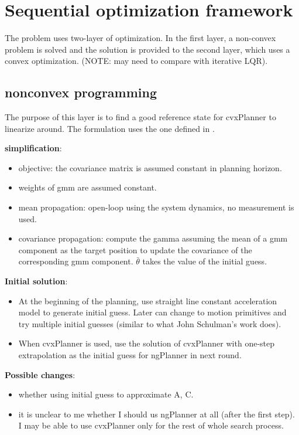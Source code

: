 \documentclass[letterpaper, 10 pt, conference]{ieeeconf}  %
\begin{document}
\section{Sequential optimization framework}
The problem uses two-layer of optimization. In the first layer, a non-convex problem is solved and the solution is provided to the second layer, which uses a convex optimization. (NOTE: may need to compare with iterative LQR).
\subsection{nonconvex programming}
The purpose of this layer is to find a good reference state for cvxPlanner to linearize around. The formulation uses the one defined in .

\textbf{simplification}:
\begin{itemize}
	\item objective: the covariance matrix is assumed constant in planning horizon.
	\item weights of gmm are assumed constant.
	\item mean propagation: open-loop using the system dynamics, no measurement is used.
	\item covariance propagation: compute the gamma assuming the mean of a gmm component as the target position to update the covariance of the corresponding gmm component. $\bar{\theta}$ takes the value of the initial guess.
\end{itemize}

\textbf{Initial solution}:
\begin{itemize}
	\item At the beginning of the planning, use straight line constant acceleration model to generate initial guess. Later can change to motion primitives and try multiple initial guesses (similar to what John Schulman's work does).
	\item When cvxPlanner is used, use the solution of cvxPlanner with one-step extrapolation as the initial guess for ngPlanner in next round.
\end{itemize}

\textbf{Possible changes}: 
\begin{itemize}
	\item whether using initial guess to approximate A, C.
	\item it is unclear to me whether I should us ngPlanner at all (after the first step). I may be able to use cvxPlanner only for the rest of whole search process.
\end{itemize}
\end{document}
